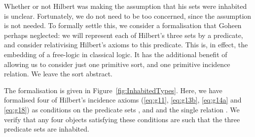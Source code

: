 Whether or not Hilbert was making the assumption that his sets were inhabited is unclear. Fortunately, we do not need to be too concerned, since the assumption is not needed. To formally settle this, we consider a formalisation that Goheen perhaps neglected: we will represent each of Hilbert's three sets by a predicate, and consider relativising Hilbert's axioms to this predicate. This is, in effect, the embedding of a free-logic in classical logic. It has the additional benefit of allowing us to consider just one primitive sort, and one primitive incidence relation. We leave the sort abstract.

The formalisation is given in Figure~\ref{fig:InhabitedTypes}. Here, we have formalised four of Hilbert's incidence axioms (\ref{eq:g11}, \ref{eq:g13b}, \ref{eq:g14a} and \ref{eq:g18}) as conditions on the predicate sets ,  and  and the single relation . We verify that any four objects satisfying these conditions are such that the three predicate sets are inhabited.

